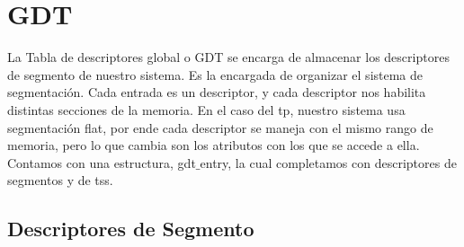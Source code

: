 
\section{GDT}
\par{La Tabla de descriptores global o GDT se encarga de almacenar los descriptores de segmento de nuestro sistema. Es la encargada de organizar el sistema de segmentación.
Cada entrada es un descriptor, y cada descriptor nos habilita distintas secciones de la memoria. En el caso del tp, nuestro sistema usa segmentación flat, por ende cada descriptor se maneja con el mismo rango de memoria, pero lo que cambia son los atributos con los que se accede a ella.
Contamos con una estructura, gdt$\_$entry, la cual completamos con descriptores de segmentos y de tss.}
\subsection{Descriptores de Segmento}
